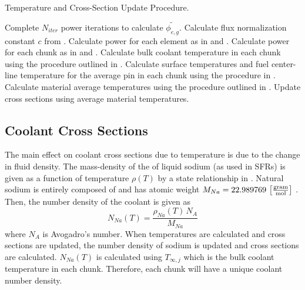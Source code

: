   \begin{algorithm}
    \caption{Temperature and Cross-Section Update Procedure.}
    \label{algorithm:temperature_update}
    \begin{algorithmic}[1]
      \State Complete $N_{iter}$ power iterations to calculate
        $\widetilde{\phi_{e,g}}$.
      \State Calculate flux normalization constant $c$ from
        .
      \State Calculate power for each element as in  and
        .
      \State Calculate power for each chunk as in  and
        .
      \State Calculate bulk coolant temperature in each chunk using the 
        procedure outlined in .
      \State Calculate surface temperatures and fuel center-line temperature
        for the average pin in each chunk using the procedure in 
        .
      \State Calculate material average temperatures using the procedure 
        outlined in .
      \State Update cross sections using average material temperatures.
    \end{algorithmic}
  \end{algorithm}

  \subsection{Coolant Cross Sections}
    The main effect on coolant cross sections due to temperature is due to the
    change in fluid density. The mass-density of the of liquid sodium (as used 
    in SFRs) is given as a function of temperature $\rho(T)$ by a state 
    relationship in \cite{sodiumProp}. Natural sodium is entirely composed of 
     and has atomic weight ${M_{Na} = 22.989769
    \,\left[\text{{$\frac{\text{gram}}{\text{mol}}$}}\right]}$ \cite{nuclides}.
    Then, the number density of the coolant is given as
    \begin{equation}
      \label{eq:number_density_sodium}
      N_{Na}(T) = \frac{\rho_{Na}(T) \, N_A}{M_{Na}}
    \end{equation}
    where $N_A$ is Avogadro's number. When temperatures are calculated and
    cross sections are updated, the number density of sodium is updated and
    cross sections are calculated. $N_{Na}(T)$ is calculated using
    $T_{\infty,j}$ which is the bulk coolant temperature in each chunk.
    Therefore, each chunk will have a unique coolant number density.
    

